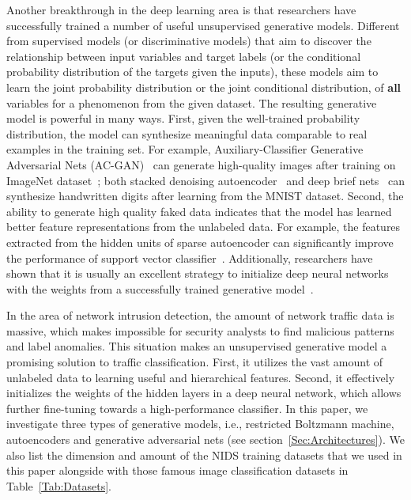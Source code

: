 Another breakthrough in the deep learning area is that researchers have successfully trained
a number of useful unsupervised generative models.
Different from supervised models (or discriminative models) that aim to discover
the relationship between input variables and target labels (or the conditional probability distribution of the targets given the inputs),
these models aim to learn the joint probability distribution or the joint conditional distribution,
of \textbf{all} variables for a phenomenon from the given dataset.
The resulting generative model is powerful in many ways.
First, given the well-trained probability distribution, the model can synthesize meaningful data
comparable to real examples in the training set.
For example, Auxiliary-Classifier Generative Adversarial Nets (AC-GAN)~\cite{AC-GAN} can generate  high-quality images after training on ImageNet dataset~\cite{ImageNet};
both stacked denoising autoencoder~\cite{DenoiseAE} and deep brief nets~\cite{DeepBeliefNets} can synthesize handwritten digits after learning from the MNIST dataset.
Second, the ability to generate high quality faked data indicates that
the model has learned better feature representations from the unlabeled data.
For example, the features extracted from the hidden units of sparse autoencoder
can significantly improve the performance of support vector classifier~\cite{SparseAE}.
Additionally, researchers have shown that it is usually an excellent strategy to initialize deep neural networks with the weights from a successfully trained generative model~\cite{DeepBeliefNets, Momentum}.

In the area of network intrusion detection, the amount of network traffic data is massive,
which makes impossible for security analysts to find malicious patterns and label anomalies.
This situation makes an unsupervised generative model a promising solution
to traffic classification. %
First, it utilizes the vast amount of unlabeled data to learning useful and hierarchical features. Second, it effectively initializes the weights of the hidden layers in a deep neural network, which allows further fine-tuning towards a high-performance classifier.
In this paper, we investigate three types of generative models, i.e.,
restricted Boltzmann machine, autoencoders and generative adversarial nets (see section~\ref{Sec:Architectures}). 
We also list the dimension and amount of the NIDS training datasets that we used in this paper alongside with those famous image classification datasets in Table~\ref{Tab:Datasets}.

